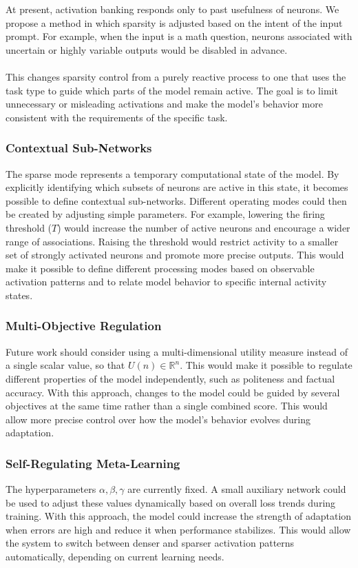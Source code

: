 \documentclass[11pt, letterpaper]{article}
\begin{document}
At present, activation banking responds only to past usefulness of neurons. We propose a method in which sparsity is adjusted based on the intent of the input prompt. For example, when the input is a math question, neurons associated with uncertain or highly variable outputs would be disabled in advance.

\paragraph{}
This changes sparsity control from a purely reactive process to one that uses the task type to guide which parts of the model remain active. The goal is to limit unnecessary or misleading activations and make the model’s behavior more consistent with the requirements of the specific task.

\subsubsection{Contextual Sub-Networks}
The sparse mode represents a temporary computational state of the model. By explicitly identifying which subsets of neurons are active in this state, it becomes possible to define contextual sub-networks.
Different operating modes could then be created by adjusting simple parameters. For example, lowering the firing threshold ($T$) would increase the number of active neurons and encourage a wider range of associations. Raising the threshold would restrict activity to a smaller set of strongly activated neurons and promote more precise outputs. This would make it possible to define different processing modes based on observable activation patterns and to relate model behavior to specific internal activity states.

\subsubsection{Multi-Objective Regulation}
Future work should consider using a multi-dimensional utility measure instead of a single scalar value, so that $U(n) \in \mathbb{R}^n$. This would make it possible to regulate different properties of the model independently, such as politeness and factual accuracy.
With this approach, changes to the model could be guided by several objectives at the same time rather than a single combined score. This would allow more precise control over how the model’s behavior evolves during adaptation.

\subsubsection{Self-Regulating Meta-Learning}
The hyperparameters $\alpha, \beta, \gamma$ are currently fixed. A small auxiliary network could be used to adjust these values dynamically based on overall loss trends during training.
With this approach, the model could increase the strength of adaptation when errors are high and reduce it when performance stabilizes. This would allow the system to switch between denser and sparser activation patterns automatically, depending on current learning needs.
\end{document}
